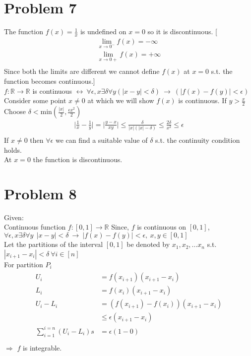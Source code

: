 \documentclass[paper=a4, fontsize=11pt]{scrartcl} %
\numberwithin{equation}{section} %
\numberwithin{figure}{section} %
\numberwithin{table}{section} %
\begin{document}
\section{Problem 7}
The function $f(x) = \frac{1}{x}$ is undefined on $x=0$ so it is discontinuous. [
\begin{align*}
	\lim_{x\rightarrow 0^-} f(x) = -\infty \\
	\lim_{x\rightarrow 0+} f(x) = +\infty \\	
\end{align*} 
Since both the limits are different we cannot define $f(x)$ at $x=0$ s.t. the function becomes continuous.]\\
$f:\mathbb{R} \rightarrow \mathbb{R}$ is continuous $\leftrightarrow \ \forall \epsilon ,x \exists \delta \forall y (|x-y| < \delta) \ \rightarrow \ (|f(x)-f(y)| < \epsilon)$\\
Consider some point $x\neq 0$ at which we will show $f(x)$ is continuous. If $y>\frac{x}{2}$\\
Choose $\delta<\text{min}\left(\frac{|x|}{2},\frac{\epsilon x^2}{2}\right)$\\
\begin{align*}
\Big|\frac{1}{x} - \frac{1}{y}\Big| = \Big|\frac{y-x}{xy}\Big| \leq \frac{\delta}{|x|(|x| - \delta)}\leq \frac{2\delta}{x^2}\leq \epsilon\\
\end{align*}
If $x\neq 0$ then $\forall \epsilon$ we can find a suitable value of $\delta$ s.t. the continuity condition holds. \\
At $x=0$ the function is discontinuous. 
\section{Problem 8}
Given: \\
Continuous function $f:[0,1] \rightarrow \mathbb{R}$
Since, $f$ is continuous on $[0,1]$, \\
$\forall \epsilon ,x \exists \delta \forall y\ \ |x-y| < \delta\  \rightarrow\ |f(x) - f(y)| < \epsilon ,\ x,y \in [0,1]$\\
Let the partitions of the interval $[0,1]$ be denoted by $x_1, x_2, ... x_n$ s.t. $|x_{i+1} - x_i| < \delta\ \forall i\in [n]$ \\
For partition $P_i$ \\
\begin{align*}
\begin{split}
	U_i &= f(x_{i+1})(x_{i+1} - x_i)\\
	L_i &= f(x_i)(x_{i+1} - x_i)\\
	U_i - L_i &= (f(x_{i+1})-f(x_i))(x_{i+1} - x_i)\\
	&\leqslant \epsilon(x_{i+1} - x_i)\\
	\sum_{i=1}^{i=n} ( U_i - L_i) s&= \epsilon (1-0)\\ 
\end{split}
\end{align*}
$\Rightarrow$ $f$ is integrable.
\end{document}
